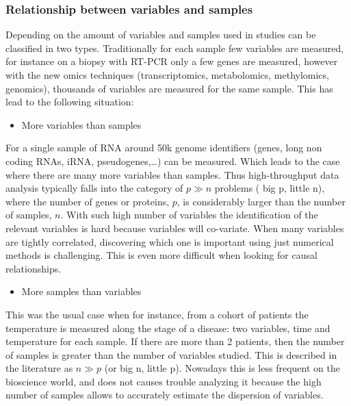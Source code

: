 \documentclass[
  12pt,
  a4paper,
  twoside,
  openright]{book}
\providecommand{\tightlist}{%
  \setlength{\itemsep}{0pt}\setlength{\parskip}{0pt}}
\begin{document}
\hypertarget{relationship-between-variables-and-samples}{%
\subsubsection{Relationship between variables and samples}\label{relationship-between-variables-and-samples}}

Depending on the amount of variables and samples used in studies can be classified in two types.
Traditionally for each sample few variables are measured, for instance on a biopsy with RT-PCR only a few genes are measured, however with the new omics techniques (transcriptomics, metabolomics, methylomics, genomics), thousands of variables are measured for the same sample.
This has lead to the following situation:

\begin{itemize}
\tightlist
\item
  More variables than samples
\end{itemize}

For a single sample of RNA around 50k genome identifiers (genes, long non coding RNAs, iRNA, pseudogenes,\ldots) can be measured.
Which leads to the case where there are many more variables than samples.
Thus high-throughput data analysis typically falls into the category of \(p \gg n\) problems ( big p, little n), where the number of genes or proteins, \(p\), is considerably larger than the number of samples, \(n\).
With such high number of variables the identification of the relevant variables is hard because variables will co-variate.
When many variables are tightly correlated, discovering which one is important using just numerical methods is challenging.
This is even more difficult when looking for causal relationships.

\begin{itemize}
\tightlist
\item
  More samples than variables
\end{itemize}

This was the usual case when for instance, from a cohort of patients the temperature is measured along the stage of a disease: two variables, time and temperature for each sample.
If there are more than 2 patients, then the number of samples is greater than the number of variables studied.
This is described in the literature as \(n \gg p\) (or big n, little p).
Nowadays this is less frequent on the bioscience world, and does not causes trouble analyzing it because the high number of samples allows to accurately estimate the dispersion of variables.
\end{document}

